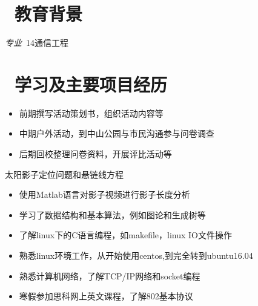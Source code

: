 \documentclass{resume}
\begin{document}


 
\section{\faGraduationCap\  教育背景}

\textit{专业}\ 14通信工程

\section{\faUsers\ 学习及主要项目经历}
\role{干事}{团队综合项目}
\begin{itemize}
  \item 前期撰写活动策划书，组织活动内容等
  \item 中期户外活动，到中山公园与市民沟通参与问卷调查
  \item 后期回校整理问卷资料，开展评比活动等 
\end{itemize}

\begin{onehalfspacing}
太阳影子定位问题和悬链线方程
\begin{itemize}
  \item 使用Matlab语言对影子视频进行影子长度分析
  \item 学习了数据结构和基本算法，例如图论和生成树等
\end{itemize}
\end{onehalfspacing}

\begin{onehalfspacing}
\begin{itemize}
  \item 了解linux下的C语言编程，如makefile，linux IO文件操作
  \item 熟悉linux环境工作，从开始使用centos,到完全转到ubuntu16.04
  \item 熟悉计算机网络，了解TCP/IP网络和socket编程
  \item 寒假参加思科网上英文课程，了解802基本协议
\end{itemize}
\end{onehalfspacing}
\end{document}

